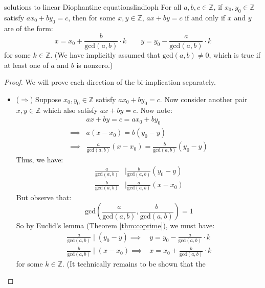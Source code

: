 \documentclass{article}
\theoremstyle{definition}
\def\gcd{\textrm{gcd}}
\def\divides{\mid}
\begin{document}
\begin{theorem}{solutions to linear Diophantine equations}{lindioph}
  For all $a,b,c \in \mathbb{Z}$, if $x_0, y_0 \in \mathbb{Z}$ satisfy
  $ax_0 + by_0 = c$, then for some $x,y \in \mathbb{Z}$, $ax+by=c$ if and only
  if $x$ and $y$ are of the form:
  \begin{equation*}
    x = x_0 + \frac{b}{\gcd(a,b)} \cdot k\quad \quad
    y = y_0 - \frac{a}{\gcd(a,b)} \cdot k
  \end{equation*}
  for some $k \in \mathbb{Z}$. (We have implicitly assumed that $\gcd(a,b) \neq
  0$, which is true if at least one of $a$ and $b$ is nonzero.)
\end{theorem}
\begin{proof}
  We will prove each direction of the bi-implication separately.
  \begin{itemize}
    \item ($\Longrightarrow$) Suppose $x_0,y_0 \in \mathbb{Z}$ satisfy
      $ax_0+by_0=c$. Now consider another pair $x,y \in \mathbb{Z}$ which also
      satisfy $ax+by=c$. Now note:
      \begin{align*}
                 & ax+by=c=ax_0+by_0                                       \\
        \implies & a(x-x_0) = b(y_0-y)                                     \\
        \implies & \frac{a}{\gcd(a,b)}(x-x_0) = \frac{b}{\gcd(a,b)}(y_0-y)
      \end{align*}
      Thus, we have:
      \begin{align*}
        \frac{a}{\gcd(a,b)} & \divides \frac{b}{\gcd(a,b)}(y_0-y) \\
        \frac{b}{\gcd(a,b)} & \divides \frac{a}{\gcd(a,b)}(x-x_0)
      \end{align*}
      But observe that:
      \begin{equation*}
        \gcd\left(\frac{a}{\gcd(a,b)}, \frac{b}{\gcd(a,b)}\right) = 1
      \end{equation*}
      So by Euclid's lemma (Theorem \ref{thm:coprime}), we must have:
      \begin{align*}
        \frac{a}{\gcd(a,b)} \divides (y_0 - y) \implies
          & y = y_0 - \frac{a}{\gcd(a,b)} \cdot k        \\
        \frac{b}{\gcd(a,b)} \divides (x - x_0) \implies
          & x = x_0 + \frac{b}{\gcd(a,b)} \cdot k
      \end{align*}
      for some $k \in \mathbb{Z}$. (It technically remains to be shown that the

\end{itemize}
\end{proof}
\end{document}
